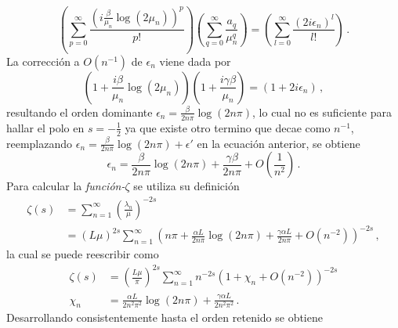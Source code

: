 \begin{equation}
    \left(
    \sum _{p = 0} ^{\infty} \frac{ \left( i \frac{\beta}{ \mu _n } \log(2 \mu _n ) \right) ^p }{p!}
    \right)
    \left(
	\sum _{q = 0} ^{\infty} \frac{a _q}{\mu _n ^q}
	\right)
    =
    \left(
    \sum _{l = 0} ^{\infty} \frac{( 2 i \epsilon _n)^l}{l !}
    \right)
    	\, .
\end{equation}
La corrección a $O ( n ^{-1}) $ de $\epsilon _n$ viene dada por
\begin{equation}
\left( 1 + \frac{i \beta}{ \mu _n} \log ( 2 \mu _n) \right) 
\left(1 + \frac{i  \gamma \beta}{ \mu _n} \right)  =
(1 + 2 i \epsilon _n) \, ,
\end{equation}
resultando el orden dominante $\epsilon _n =  \frac{\beta }{2 n \pi}  \log (2 n \pi)$, lo cual no es suficiente para hallar el polo en $s=- \frac{1}{2}$ ya que existe otro termino que decae como $ n ^{-1}$, reemplazando $\epsilon _n =  \frac{\beta }{2 n \pi} \log (2 n \pi) + \epsilon '$ en la ecuación anterior, se obtiene
\begin{equation}\label{anterior}
    \epsilon _n =  \frac{\beta }{2 n \pi} \log (2 n \pi) +
                \frac{\gamma \beta}{2 n \pi} +
                O\left(  \frac{1}{n^2} \right)
                	\, .
\end{equation}
Para calcular la {\it función-$\zeta $} se utiliza su definición
\begin{equation}
\begin{aligned}
    \zeta (s) &= \sum _{n=1} ^{\infty} \left( \frac{\lambda _n}{\mu} \right) ^{-2 s}  \\
    & =    ( L \mu ) ^{2 s} \sum _{n=1} ^{\infty} 
    \left( 
    n \pi + \frac{\alpha L }{2 n \pi} \log (2 n \pi) + \frac{\gamma \alpha L}{2 n \pi} +
    O \left( n^{-2} \right)
    \right) ^{-2s}
    	\, ,
\end{aligned}
\end{equation}
la cual se puede reescribir como
\begin{equation}
\begin{aligned}
    \zeta  (s) &= \left( \frac{L \mu }{\pi} \right)  ^{2 s} 
    \sum _{n=1} ^{\infty} n ^{- 2  s} 
    \left(
    	1 + \chi _n  + O( n^{-2} )
    	\right) ^{-2 s} \\[5pt]
		 \chi _n &= 
    	\frac{\alpha L  }{2 n^2 \pi ^2} \log (2 n \pi) + 
    	\frac{\gamma \alpha L}{2 n^2 \pi ^2 }  
    			\, .
\end{aligned}
\end{equation}
Desarrollando consistentemente hasta el orden retenido se obtiene
